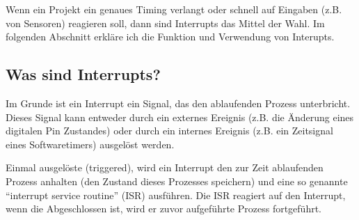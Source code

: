 Wenn ein Projekt  ein  genaues Timing verlangt oder schnell auf Eingaben (z.B. von Sensoren) 
reagieren soll,  dann sind Interrupts das Mittel der Wahl. Im folgenden Abschnitt erkläre ich die 
Funktion und Verwendung von Interupts. \citet{engblaze_we_2013}


%
%


\subsection{Was sind Interrupts?}

Im Grunde ist ein Interrupt ein Signal, das den ablaufenden Prozess unterbricht. Dieses Signal 
kann entweder durch ein externes Ereignis (z.B. die Änderung eines digitalen Pin Zustandes) oder durch 
ein internes Ereignis (z.B. ein Zeitsignal eines Softwaretimers) ausgelöst werden.

Einmal ausgelöste (triggered), wird ein Interrupt den zur Zeit ablaufenden Prozess anhalten (den 
Zustand dieses Prozesses speichern)  und eine so genannte ``interrupt service routine'' (ISR) 
ausführen. Die ISR reagiert auf den Interrupt, wenn die Abgeschlossen ist, wird er zuvor aufgeführte 
Prozess fortgeführt. 

